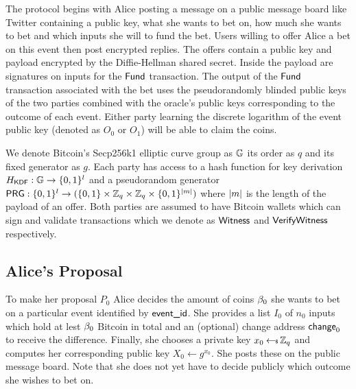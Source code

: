 \documentclass[runningheads]{llncs}
\begin{document}
The protocol begins with Alice posting a message on a public message board like Twitter containing a public key, what she wants to bet on, how much she wants to bet and which inputs she will to fund the bet. Users willing to offer Alice a bet on this event then post encrypted replies. The offers contain a public key and payload encrypted by the Diffie-Hellman shared secret. Inside the payload are signatures on inputs for the $\textsf{Fund}$ transaction. The output of the $\textsf{Fund}$ transaction associated with the bet uses the pseudorandomly blinded public keys of the two parties combined with the oracle's public keys corresponding to the outcome of each event. Either party learning the discrete logarithm of the event public key (denoted as $O_0$ or $O_1$) will be able to claim the coins.

We denote Bitcoin's Secp256k1 elliptic curve group as $\mathbb{G}$ its order as $q$ and its fixed generator as $g$. Each party has access to a hash function for key derivation $H_{\textsf{KDF}}: \mathbb{G} \rightarrow \{0,1\}^{l}$ and a pseudorandom generator $\textsf{PRG} : \{0,1\}^l \rightarrow (\{0,1\} \times \mathbb{Z}_q \times \mathbb{Z}_q \times \{0,1\}^{\left\lvert m \right\rvert})$ where $\left\lvert m \right\rvert$ is the length of the payload of an offer. Both parties are assumed to have Bitcoin wallets which can sign and validate transactions which we denote as $\textsf{Witness}$ and $\textsf{VerifyWitness}$ respectively.

\subsection{Alice's Proposal}

To make her proposal $P_0$ Alice decides the amount of coins $\beta_0$ she wants to bet on a particular event identified by $\textsf{event\_id}$. She provides a list $I_0$ of
$n_0$ inputs which hold at lest $\beta_0$ Bitcoin in total and an (optional) change address $\textsf{change}_0$ to receive the difference. Finally, she chooses a private key $x_0 \hskip2.3pt{\gets\!\!\mbox{\tiny${\$}$\normalsize}}\, \mathbb{Z}_q$ and computes her corresponding public key $X_0 \gets g^{x_0}$. She posts these on the public message board. Note that she does not yet have to decide publicly which outcome she wishes to bet on.

\begin{center}
\end{center}
\end{document}
